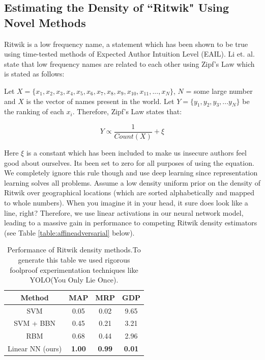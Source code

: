 \documentclass[]{article}
\begin{document}
\subsection{Estimating the Density of ``Ritwik" Using Novel Methods}
Ritwik is a low frequency name, a statement which has been shown to be true using time-tested methods of Expected Author Intuition Level (EAIL). Li et. al. \cite{Baby} state that low frequency names are related to each other using Zipf's Law which is stated as follows:

\vspace{2mm}
Let $X = \{x_1, x_2, x_3, x_4, x_5, x_6, x_7, x_8, x_9, x_{10}, x_{11}, ... , x_N\}$, $N$ = some large number and $X$ is the vector of names present in the world. Let $Y = \{y_1, y_2, y_3, ... y_N\}$ be the ranking of each $x_i$. Therefore, Zipf's Law states that:

\begin{equation}
Y \propto \frac{1}{Count(X)} + \xi
\end{equation}


Here $\xi$ is a constant which has been included to make us insecure authors feel good about ourselves. Its been set to zero for all purposes of using the equation. \\
We completely ignore this rule though and use deep learning since representation learning solves all problems. Assume a low density uniform prior on the density of Ritwik over geographical locations (which are sorted alphabetically and mapped to whole numbers). When you imagine it in your head, it sure does look like a line, right? Therefore, we use linear activations in our neural network model, leading to a massive gain in performance to competing Ritwik density estimators (see Table \ref{table:affineadversarial} below).

\begin{table}[h]
\centering
\begin{tabular}{|c|c|c|c|}
	\hline
	\textbf{Method} & \textbf{MAP} & \textbf{MRP} & \textbf{GDP} \\
	\hline
	SVM & 0.05 & 0.02 & 9.65 \\
	\hline
	SVM + BBN & 0.45 & 0.21 & 3.21 \\
	\hline
	RBM & 0.68 & 0.44 & 2.96 \\
	\hline
	Linear NN (ours) & \textbf{1.00} & \textbf{0.99} & \textbf{0.01}\\
	\hline
\end{tabular}
\caption{Performance of Ritwik density methods.To generate this table we used rigorous foolproof experimentation techniques like YOLO(You Only Lie Once).}
\label{table:densitycomp}
\end{table}
\end{document}
